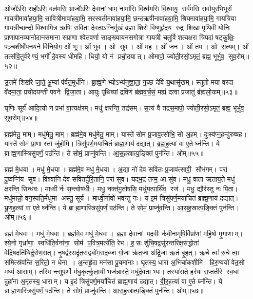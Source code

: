 ओजो॑ऽसि॒ सहो॑ऽसि॒ बल॑मसि॒ भ्राजो॑ऽसि दे॒वानां॒ धाम॒ नामा॑सि॒ विश्व॑मसि वि॒श्वायु॒ सर्व॑मसि स॒र्वायुरभिभूरों गायत्रीमावा॑हया॒मि॒ सावित्रीमावा॑हया॒मि॒ सरस्वतीमावा॑ह\-या॒मि॒ छन्दऋषीनावा॑हया॒मि॒ श्रियमावा॑हया॒मि॒ गायत्रिया गायत्रीच्छन्दो विश्वामित्र ऋषिः सविता देवताऽग्निर्मुखं ब्रह्मा शिरो विष्णुर्\mbox{}हृदय रुद्रः शिखा पृथिवी योनिः प्राणापानव्यानोदानसमाना सप्राणा श्वेतवर्णा साङ्ख्यायनसगोत्रा गायत्री चतुर्विशत्यक्षरा त्रिपदा॑ षट्कु॒क्षिः॒ पञ्चशीर्\mbox{}षोपनयने वि॑नियो॒ग॒ ओं भूः। ओं भुव। ओ सुव। ओं मह। ओं जन। ओं तप। ओ स॒त्यम्। ओं तत्स॑वि॒तुर्वरेण्यं॒ भर्गो॑ दे॒वस्य॑ धीमहि। धियो॒ यो न॑ प्रचो॒दयात्। ओमापो॒ ज्योती॒रसो॒ऽमृतं॒ ब्रह्म॒ भूर्भुव॒ सुव॒रोम्॥५२॥
\anuvakamend

उ॒त्तमे॑ शिख॑रे जा॒ते॒ भू॒म्यां प॑र्वत॒मूर्ध॑नि। ब्रा॒ह्म॒णेभ्योऽभ्य॑नु\-ज्ञा॒ता॒ ग॒च्छ दे॑वि य॒थासु॑खम्। स्तुतो मया वरदा वे॑दमा॒ता॒ प्रचोदयन्ती पवने द्विजा॒ता। आयुः पृथिव्यां द्रविणं ब्र॑ह्मव॒र्च॒सं॒ मह्यं दत्वा प्रजातुं ब्र॑ह्मलो॒कम्॥५३॥
\anuvakamend

घृणिः सूर्य॑ आदि॒त्यो न प्रभा॑ वा॒त्यक्ष॑रम्। मधु॑ क्षरन्ति॒ तद्र॑सम्। स॒त्यं वै तद्रस॒मापो॒ ज्योती॒रसो॒ऽमृतं॒ ब्रह्म॒ भूर्भुव॒ सुव॒रोम्॥५४॥\anuvakamend

ब्रह्म॑मेतु॒ माम्। मधु॑मेतु॒ माम्। ब्रह्म॑मे॒व मधु॑मेतु॒ माम्। यास्ते॑ सोम प्र॒जाव॒त्सोभि॒ सो अ॒हम्। दुःस्व॑प्न॒हन्दु॑रुष्षह। यास्ते॑ सोम प्रा॒णास्तां जु॑होमि। त्रिसु॑पर्ण॒मया॑चितं ब्राह्म॒णाय॑ दद्यात्। ब्र॒ह्म॒ह॒त्यां वा ए॒ते घ्न॑न्ति। ये ब्राह्म॒णास्त्रिसु॑पर्णं॒ पठ॑न्ति। ते सोमं॒ प्राप्नु॑वन्ति। आ॒स॒ह॒स्रात्प॒ङ्क्तिं पुन॑न्ति। ओम्॥५५॥
\anuvakamend

ब्रह्म॑ मे॒धया। मधु॑ मे॒धया। ब्रह्म॑मे॒व मधु॑ मे॒धया। अ॒द्या नो॑ देव सवितः प्र॒जाव॑त्सावी॒ सौभ॑गम्। परा॑ दु॒ष्वप्नि॑य सुव। विश्वा॑नि देव सवितर्दुरि॒तानि॒ परा॑ सुव। यद्भ॒द्रं तन्म॒ आ सु॑व। मधु॒ वाता॑ ऋताय॒ते मधु॑ क्षरन्ति॒ सिन्ध॑वः। माध्वीर्नः स॒न्त्वोष॑धीः। मधु॒ नक्त॑मु॒तोषसि॒ मधु॑म॒त्पार्थि॑व॒ रज॑। मधु॒ द्यौर॑स्तु नः पि॒ता। मधु॑मान्नो॒ वन॒स्पति॒र्मधु॑मा अस्तु॒ सूर्य॑। माध्वी॒र्गावो॑ भवन्तु नः। य इ॒मं त्रिसु॑पर्ण॒मया॑चितं ब्राह्म॒णाय॑ दद्यात्। भ्रू॒ण॒ह॒त्यां वा ए॒ते घ्न॑न्ति। ये ब्राह्म॒णास्त्रिसु॑पर्णं॒ पठ॑न्ति। ते सोमं॒ प्राप्नु॑वन्ति। आ॒स॒ह॒स्रात्प॒ङ्क्तिं पुन॑न्ति। ओम्॥५६॥
\anuvakamend


ब्रह्म॑ मे॒धवा। मधु॑ मे॒धवा। ब्रह्म॑मे॒व मधु॑ मे॒धवा। ब्र॒ह्मा दे॒वानां पद॒वीः क॑वी॒नामृषि॒र्विप्रा॑णां महि॒षो मृ॒गाणाम्। श्ये॒नो गृध्रा॑णा॒ स्वधि॑ति॒र्वना॑ना॒ सोम॑ प॒वित्र॒मत्ये॑ति॒ रेभ\sn{}। ह॒सः शु॑चि॒षद्वसु॑रन्तरिक्ष॒सद्धोता॑ वेदि॒षदति॑थिर्दुरोण॒सत्। नृ॒षद्व॑र॒सदृ॑त॒सद्व्यो॑म॒सद॒ब्जा गो॒जा ऋ॑त॒जा अ॑द्रि॒जा ऋ॒तं बृ॒हत्। ऋ॒चे त्वा॑ रु॒चे त्वा॒ समित्स्र॑वन्ति स॒रितो॒ न धेना। अ॒न्तर्\mbox{}हृ॒दा मन॑सा पू॒यमा॑नाः। घृ॒तस्य॒ धारा॑ अ॒भिचा॑कशीमि। हि॒र॒ण्ययो॑ वेत॒सो मध्य॑ आसाम्। \mbox{तस्मि\hspace{1ex}\hspace{-1ex}न्त्सु}\-प॒र्णो म॑धु॒कृत्कु॑ला॒यी भज॑न्नास्ते॒ मधु॑\-दे॒वताभ्यः। तस्या॑सते॒ हर॑यः स॒प्ततीरे स्व॒धां दुहा॑ना अ॒मृत॑स्य॒ धाराम्। य इ॒दं त्रिसु॑पर्ण॒मया॑चितं ब्राह्म॒णाय॑ दद्यात्। वी॒र॒ह॒त्यां वा ए॒ते घ्न॑न्ति। ये ब्राह्म॒णास्त्रिसु॑पर्णं॒ पठ॑न्ति। ते सोमं॒ प्राप्नु॑वन्ति। आ॒स॒ह॒स्रात्प॒ङ्क्तिं पुन॑न्ति। ओम्॥५७॥
\anuvakamend

